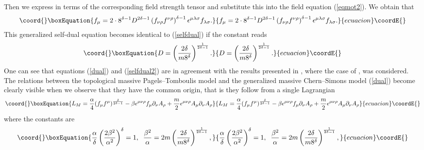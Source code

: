 \documentclass[a4 paper, 12 pt] {article}
\begin{document}
Then we express \coordHE{} in terms of the corresponding field
strength tensor and substitute this into the field equation
(\ref{eqmot2}).  We obtain that
\begin{equation}\coord{}\boxEquation{
f_{\mu } =2 \cdot 8^{\delta -1} D^{2
\delta -1}
\left(f_{ \nu  \rho} f^{\nu \rho } \right)^{\delta -1} \epsilon^{\mu
\lambda \sigma } f_{\lambda \sigma }.
\label{selfdual2}
}{
f_{\mu } =2 \cdot 8^{\delta -1} D^{2
\delta -1}
\left(f_{ \nu  \rho} f^{\nu \rho } \right)^{\delta -1} \epsilon^{\mu
\lambda \sigma } f_{\lambda \sigma }.
}{ecuacion}\coordE{}\end{equation}
This generalized self-dual equation becomes identical to (\ref{selfdual})
if the constant \coordHE{} reads
\begin{equation}\coord{}\boxEquation{
D=\left( \frac{2\delta }{m8^{\delta }} \right)^{\frac{1}{2\delta -1}}.
\label{const}
}{
D=\left( \frac{2\delta }{m8^{\delta }} \right)^{\frac{1}{2\delta -1}}.
}{ecuacion}\coordE{}\end{equation}
One can see that equations (\ref{dual}) and (\ref{selfdual2}) are in
agreement with the results presented in \cite{Ilha}, where the case of
\coordHE{}, \coordHE{} was considered. The relations between
the topological massive Pagels--Tomboulis model and the generalized
massive Chern--Simons model (\ref{dual}) become clearly visible when we
observe that they have the common origin, that is they follow from a
single Lagrangian
\begin{equation}\coord{}\boxEquation{
L_M=\frac{\alpha}{4} (f_{\mu} f^{\mu} )^{\frac{\delta }{2 \delta -1}}
-\beta
\epsilon^{\mu \nu \rho} f_{\mu } \partial_{\nu }A_{\rho } +\frac{m}{2}
\epsilon^{\mu \nu \rho} A_{\mu }\partial_{\nu } A_{\rho }
\label{master}
}{
L_M=\frac{\alpha}{4} (f_{\mu} f^{\mu} )^{\frac{\delta }{2 \delta -1}}
-\beta
\epsilon^{\mu \nu \rho} f_{\mu } \partial_{\nu }A_{\rho } +\frac{m}{2}
\epsilon^{\mu \nu \rho} A_{\mu }\partial_{\nu } A_{\rho }
}{ecuacion}\coordE{}\end{equation}
where the constants are
\begin{equation}\coord{}\boxEquation{
\frac{\alpha }{\delta } \left( \frac{2 \beta^2}{\alpha^2}
\right)^{\delta }=1, \; \; \frac{\beta^2}{\alpha } = 2m \left(
\frac{2\delta }{m 8^{\delta }} \right)^{\frac{1}{2\delta -1}},
\label{masterconst}
}{
\frac{\alpha }{\delta } \left( \frac{2 \beta^2}{\alpha^2}
\right)^{\delta }=1, \; \; \frac{\beta^2}{\alpha } = 2m \left(
\frac{2\delta }{m 8^{\delta }} \right)^{\frac{1}{2\delta -1}},
}{ecuacion}\coordE{}\end{equation}
\end{document}
